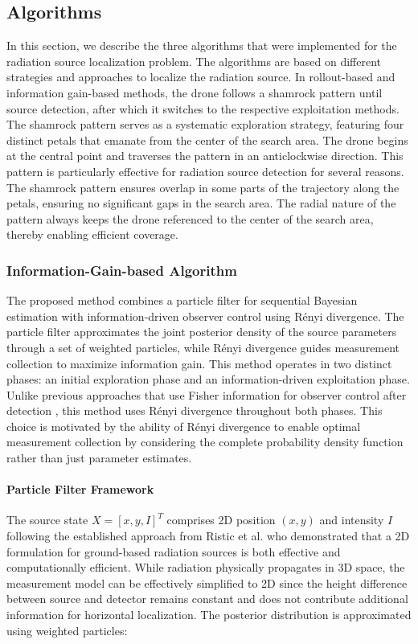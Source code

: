 \documentclass[../report.tex]{subfiles}
\begin{document}
    \subsection{Algorithms}

    In this section, we describe the three algorithms that were implemented for the radiation source localization problem. The algorithms are based on different strategies and approaches to
    localize the radiation source. In rollout-based and information gain-based methods, the drone follows a shamrock pattern until source detection, after which it switches to the 
    respective exploitation methods. The shamrock pattern serves as a systematic exploration strategy, featuring four distinct petals that emanate from the center of the search area. 
    The drone begins at the central point and traverses the pattern in an anticlockwise direction. This pattern is particularly effective for radiation source detection for several reasons.
    The shamrock pattern ensures overlap in some parts of the trajectory along the petals, ensuring no significant gaps in the search area. The radial nature of the pattern always 
    keeps the drone referenced to the center of the search area, thereby enabling efficient coverage.

    \subsubsection{Information-Gain-based Algorithm}

    The proposed method combines a particle filter for sequential Bayesian estimation with information-driven observer control using Rényi divergence. The particle filter approximates
    the joint posterior density of the source parameters through a set of weighted particles, while Rényi divergence guides measurement collection to maximize information gain. 
    This method operates in two distinct phases: an initial exploration phase and an information-driven exploitation phase. Unlike previous approaches that use Fisher information for observer control
    after detection \cite{Ristic2007AnIG}, this method uses Rényi divergence throughout both phases. This choice is motivated by the ability of Rényi divergence to enable optimal measurement collection 
    by considering the complete probability density function rather than just parameter estimates.

    \paragraph{Particle Filter Framework}
    The source state $X = [x, y, I]^T$ comprises 2D position $(x,y)$ and intensity $I$ following the established approach from Ristic et al. who demonstrated that a 2D formulation for ground-based 
    radiation sources is both effective and computationally efficient. While radiation physically propagates in 3D space, the measurement model can be effectively simplified to 2D since the height
    difference between source and detector remains constant and does not contribute additional information for horizontal localization. 
    The posterior distribution is approximated using weighted particles:
\end{document}

